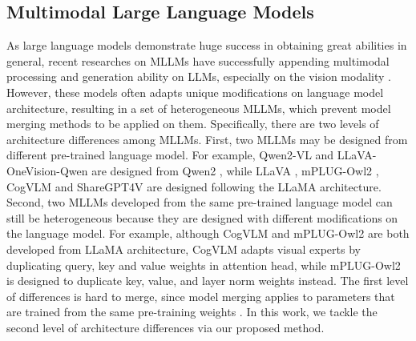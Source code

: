 
\subsection{Multimodal Large Language Models} \label{mllms}

As large language models demonstrate huge success in obtaining great abilities in general, recent researches on MLLMs have successfully appending multimodal processing and generation ability on LLMs, especially on the vision modality \cite{llava1.5, sharegpt4v, mplugowl2, cogvlm, qwen2-vl, llava-onevison}. However, these models often adapts unique modifications on language model architecture, resulting in a set of heterogeneous MLLMs, which prevent model merging methods to be applied on them. Specifically, there are two levels of architecture differences among MLLMs. 
First, two MLLMs may be designed from different pre-trained language model. For example, Qwen2-VL \cite{qwen2-vl} and LLaVA-OneVision-Qwen \cite{llava-onevison} are designed from Qwen2 \cite{qwen2}, while LLaVA \cite{llava1.5}, mPLUG-Owl2 \cite{mplugowl2}, CogVLM \cite{cogvlm} and ShareGPT4V \cite{sharegpt4v} are designed following the LLaMA \cite{llama} architecture. 
Second, two MLLMs developed from the same pre-trained language model can still be heterogeneous because they are designed with different modifications on the language model. For example, although CogVLM and mPLUG-Owl2 are both developed from LLaMA architecture, CogVLM adapts visual experts by duplicating query, key and value weights in attention head, while mPLUG-Owl2 is designed to duplicate key, value, and layer norm weights instead. 
The first level of differences is hard to merge, since model merging applies to parameters that are trained from the same pre-training weights \cite{task-arithmetic}. In this work, we tackle the second level of architecture differences via our proposed \ours method.


